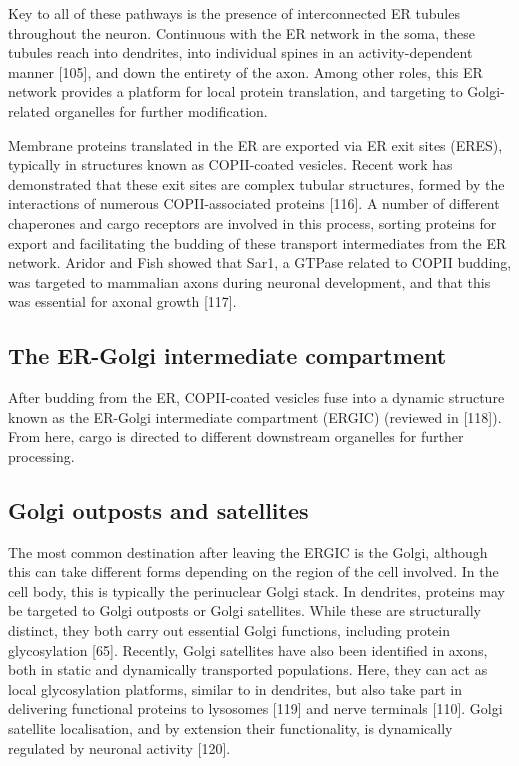 \documentclass[
  12pt,
  a4paper,
]{book}
\begin{document}
Key to all of these pathways is the presence of interconnected ER tubules throughout the neuron. Continuous with the ER network in the soma, these tubules reach into dendrites, into individual spines in an activity-dependent manner {[}105{]}, and down the entirety of the axon. Among other roles, this ER network provides a platform for local protein translation, and targeting to Golgi-related organelles for further modification.

Membrane proteins translated in the ER are exported via ER exit sites (ERES), typically in structures known as COPII-coated vesicles. Recent work has demonstrated that these exit sites are complex tubular structures, formed by the interactions of numerous COPII-associated proteins {[}116{]}. A number of different chaperones and cargo receptors are involved in this process, sorting proteins for export and facilitating the budding of these transport intermediates from the ER network. Aridor and Fish showed that Sar1, a GTPase related to COPII budding, was targeted to mammalian axons during neuronal development, and that this was essential for axonal growth {[}117{]}.

\hypertarget{the-er-golgi-intermediate-compartment}{%
\subsection{The ER-Golgi intermediate compartment}\label{the-er-golgi-intermediate-compartment}}

After budding from the ER, COPII-coated vesicles fuse into a dynamic structure known as the ER-Golgi intermediate compartment (ERGIC) (reviewed in {[}118{]}). From here, cargo is directed to different downstream organelles for further processing.

\hypertarget{golgi-outposts-and-satellites}{%
\subsection{Golgi outposts and satellites}\label{golgi-outposts-and-satellites}}

The most common destination after leaving the ERGIC is the Golgi, although this can take different forms depending on the region of the cell involved. In the cell body, this is typically the perinuclear Golgi stack. In dendrites, proteins may be targeted to Golgi outposts or Golgi satellites. While these are structurally distinct, they both carry out essential Golgi functions, including protein glycosylation {[}65{]}. Recently, Golgi satellites have also been identified in axons, both in static and dynamically transported populations. Here, they can act as local glycosylation platforms, similar to in dendrites, but also take part in delivering functional proteins to lysosomes {[}119{]} and nerve terminals {[}110{]}. Golgi satellite localisation, and by extension their functionality, is dynamically regulated by neuronal activity {[}120{]}.
\end{document}
